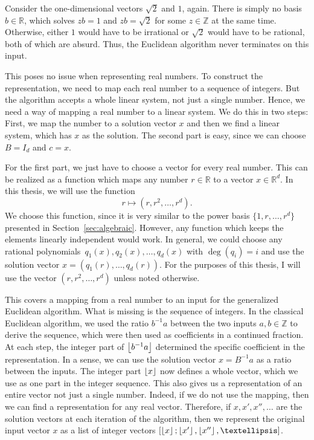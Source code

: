 \begin{example}
  Consider the one-dimensional vectors $\sqrt{2}$ and $1$, again.
  There is simply no basis $b ∈ ℝ$,
  which solves $zb = 1$ and $zb = \sqrt{2}$ for some $z ∈ ℤ$ at the same time.
  Otherwise, either $1$ would have to be irrational or $\sqrt{2}$ would have to be rational,
  both of which are absurd.
  Thus, the Euclidean algorithm never terminates on this input.
\end{example}

This poses no issue when representing real numbers.
To construct the representation,
we need to map each real number to a sequence of integers.
But the algorithm accepts a whole linear system,
not just a single number.
Hence, we need a way of mapping a real number to a linear system.
We do this in two steps:
First, we map the number to a solution vector $x$
and then we find a linear system,
which has $x$ as the solution.
The second part is easy,
since we can choose $B = I_d$ and $c = x$.

For the first part, we just have to choose a vector for every real number.
This can be realized as a function which maps any number $r ∈ ℝ$ to a vector $x ∈ ℝ^d$.
In this thesis, we will use the function
\[
  r ↦ (r, r^2, …, r^d).
\]
We choose this function,
since it is very similar to the power basis $\{1, r, …, r^d\}$
presented in Section~\ref{sec:algebraic}.
However, any function which keeps the elements linearly independent would work.
In general, we could choose any rational polynomials~$q_1(x), q_2(x), …, q_d(x)$
with $\deg(q_i) = i$ and use the solution vector $x = (q_1(r), …, q_d(r))$.
For the purposes of this thesis,
I will use the vector $(r, r^2, …, r^d)$ unless noted otherwise.


This covers a mapping from a real number to an input for the generalized Euclidean algorithm.
What is missing is the sequence of integers.
In the classical Euclidean algorithm,
we used the ratio $b^{-1}a$ between the two inputs $a, b ∈ ℤ$ to derive the sequence,
which were then used as coefficients in a continued fraction.
At each step, the integer part of $\left\lfloor b^{-1} a\right\rfloor$ determined the specific
coefficient in the representation.
In a sense, we can use the solution vector $x = B^{-1} a$ as a ratio between the inputs.
The integer part $\left\lfloor x\right\rfloor$ now defines a whole vector, which we use as
one part in the integer sequence.
This also gives us a representation of an entire vector not just a single number.
Indeed, if we do not use the mapping, then we can find a representation for any real vector.
Therefore, if $x, x', x'', …$ are the solution vectors at each iteration of the algorithm,
then we represent the original input vector $x$ as a list of integer vectors
$\left[\floor{x}; \floor{x'}, \floor{x''}, …\right]$.

